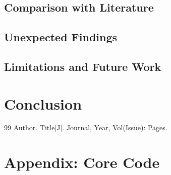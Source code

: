 \documentclass[12pt,letterpaper]{article}
\begin{document}
\subsection{Comparison with Literature}
\subsection{Unexpected Findings}
\subsection{Limitations and Future Work}

\section{Conclusion}
\label{lastmain}  %

\begin{thebibliography}{99}
 Author. Title[J]. Journal, Year, Vol(Issue): Pages.
\end{thebibliography}

\newpage
\appendix
\section*{Appendix: Core Code}
\end{document}
